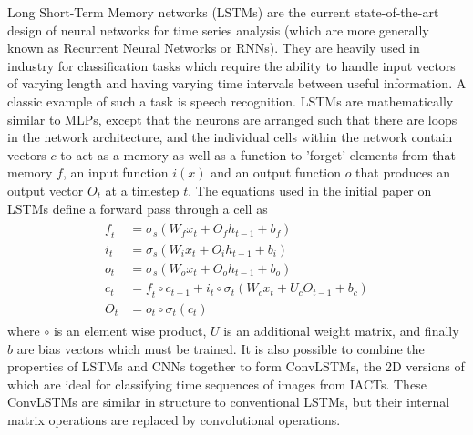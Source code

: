 Long Short-Term Memory networks (LSTMs) are the current state-of-the-art design of neural networks for time series analysis (which are more generally known as Recurrent Neural Networks or RNNs). They are heavily used in industry for classification tasks which require the ability to handle input vectors of varying length and having varying time intervals between useful information. A classic example of such a task is speech recognition.
LSTMs are mathematically similar to MLPs, except that the neurons are arranged such that there are loops in the network architecture, and the individual cells within the network contain vectors $\textit{c}$ to act as a memory as well as a function to 'forget' elements from that memory $\textit{f}$, an input function $\textit{i}(x)$ and an output function $\textit{o}$ that produces an output vector $O_t$ at a timestep $t$. The equations used in the initial paper on LSTMs define a forward pass through a cell \cite{Hochreiter} as
\begin{align}
\begin{split}
\textit{f}_t &= \sigma_s(W_{f} x_t + O_{f} h_{t-1} + b_f) \\
\textit{i}_t &= \sigma_s(W_{i} x_t + O_{i} h_{t-1} + b_i) \\
\textit{o}_t &= \sigma_s(W_{o} x_t + O_{o} h_{t-1} + b_o) \\
\textit{c}_t &= \textit{f}_t \circ c_{t-1} + \textit{i}_t \circ \sigma_t(W_{c} x_t + U_{c} O_{t-1} + b_c) \\
O_t &= o_t \circ \sigma_t(\textit{c}_t)
\end{split}
\end{align}
where $\circ$ is an element wise product, $U$ is an additional weight matrix, and finally $b$ are bias vectors which must be trained. It is also possible to combine the properties of LSTMs and CNNs together to form ConvLSTMs, the 2D versions of which are ideal for classifying time sequences of images from IACTs. These ConvLSTMs are similar in structure to conventional LSTMs, but their internal matrix operations are replaced by convolutional operations. 
